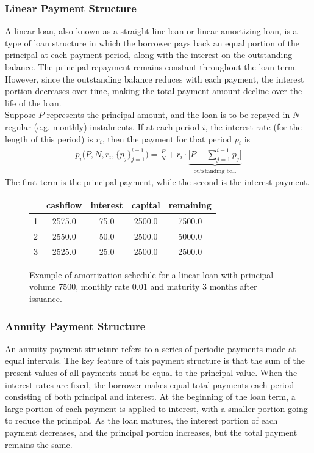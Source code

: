 \documentclass[11pt]{report}
\begin{document}
	


\subsubsection{Linear Payment Structure}

A linear loan, also known as a straight-line loan or linear amortizing loan, is a type of loan structure in which the borrower pays back an equal portion of the principal at each payment period, along with the interest on the outstanding balance. The principal repayment remains constant throughout the loan term. However, since the outstanding balance reduces with each payment, the interest portion decreases over time, making the total payment amount decline over the life of the loan.\\

Suppose $P$ represents the principal amount, and the loan is to be repayed in $N$ regular (e.g. monthly) instalments. If at each period $i$, the interest rate (for the length of this period) is $r_i$, then the payment for that period $p_i$ is 
\begin{align}
	p_i\big(P,N,r_i,\{p_j\}_{j=1}^{i-1}\big)= \frac{P}{N}+r_i\cdot\underbrace{\bigg[P-\sum_{j=1}^{i-1}p_j\bigg]}_{\text{outstanding bal.}}
	\label{linear}
\end{align}
The first term is the principal payment, while the second is the interest payment.
\begin{figure}[ht!]
	\centering
	\begin{tabular}{|c|c|c|c|c|}
		\hline
		& cashflow & interest & capital & remaining\\
		\hline
		1 & 2575.0 & 75.0 & 2500.0 & 7500.0\\
		\hline
		2 & 2550.0 & 50.0 & 2500.0 & 5000.0\\
		\hline
		3 & 2525.0 & 25.0 & 2500.0 & 2500.0\\
		\hline
	\end{tabular}
	\caption{Example of amortization schedule for a linear loan with principal volume $7500$, monthly rate $0.01$ and maturity 3 months after issuance.}
\end{figure}



\subsubsection{Annuity Payment Structure}

An annuity payment structure refers to a series of periodic payments made at equal intervals. The key feature of this payment structure is that the sum of the present values of all payments must be equal to the principal value. When the interest rates are fixed, the borrower makes equal total payments each period consisting of both principal and interest. At the beginning of the loan term, a large portion of each payment is applied to interest, with a smaller portion going to reduce the principal. As the loan matures, the interest portion of each payment decreases, and the principal portion increases, but the total payment remains the same.\\
\end{document}
